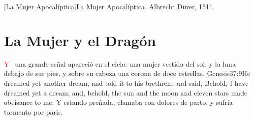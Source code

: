 [La Mujer Apocalíptica]{La Mujer Apocalíptica. Albrecht Dürer, 1511.}

\chapter{La Mujer y el Dragón}\raggedbottom
\lettrine[lines=3,slope=-0.5em,loversize=0.1]{\textcolor{red}{Y}}{\ } una grande señal apareció en el cielo:%
 una mujer vestida del sol, y la luna debajo de sus pies, y sobre su cabeza una corona de doce estrellas.%
 					   {Genesis}{37:9}{He dreamed yet another dream, and told it to his brethren, and said, Behold, I have dreamed yet a dream; and, behold, the sun and the moon and eleven stars made obeisance to me.} %
Y estando preñada, clamaba con dolores de parto, y sufría tormento por parir.%
